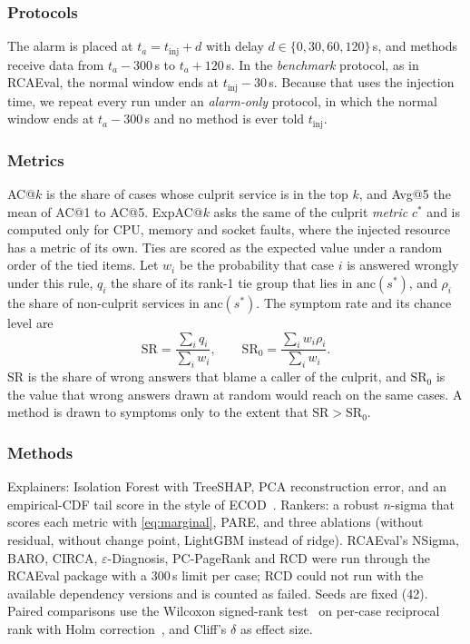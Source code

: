 \documentclass[conference]{IEEEtran}
\begin{document}
\subsubsection{Protocols}
The alarm is placed at $t_a=t_{\mathrm{inj}}+d$ with delay
$d\in\{0,30,60,120\}$\,s, and methods receive data from $t_a-300$\,s to
$t_a+120$\,s. In the \emph{benchmark} protocol, as in RCAEval, the normal window
ends at $t_{\mathrm{inj}}-30$\,s. Because that uses the injection time, we repeat
every run under an \emph{alarm-only} protocol, in which the normal window ends at
$t_a-300$\,s and no method is ever told $t_{\mathrm{inj}}$.

\subsubsection{Metrics}
AC@$k$ is the share of cases whose culprit service is in the top $k$, and Avg@5 the
mean of AC@1 to AC@5. ExpAC@$k$ asks the same of the culprit \emph{metric} $c^\ast$
and is computed only for CPU, memory and socket faults, where the injected resource
has a metric of its own. Ties are scored as the expected value under a random order
of the tied items. Let $w_i$ be the probability that case $i$ is answered wrongly
under this rule, $q_i$ the share of its rank-1 tie group that lies in
$\mathrm{anc}(s^\ast)$, and $\rho_i$ the share of non-culprit services in
$\mathrm{anc}(s^\ast)$. The symptom rate and its chance level are
\begin{equation}
\mathrm{SR}=\frac{\sum_i q_i}{\sum_i w_i},\qquad
\mathrm{SR}_0=\frac{\sum_i w_i\rho_i}{\sum_i w_i}.
\label{eq:sr}
\end{equation}
$\mathrm{SR}$ is the share of wrong answers that blame a caller of the culprit, and
$\mathrm{SR}_0$ is the value that wrong answers drawn at random would reach on the
same cases. A method is drawn to symptoms only to the extent that
$\mathrm{SR}>\mathrm{SR}_0$.

\subsubsection{Methods}
Explainers: Isolation Forest with TreeSHAP, PCA reconstruction error, and an
empirical-CDF tail score in the style of ECOD~\cite{li2022ecod}. Rankers: a robust
$n$-sigma that scores each metric with \eqref{eq:marginal}, PARE, and three
ablations (without residual, without change point, LightGBM instead of ridge).
RCAEval's NSigma, BARO, CIRCA, $\varepsilon$-Diagnosis, PC-PageRank and RCD were run
through the RCAEval package with a 300\,s limit per case; RCD could not run with
the available dependency versions and is counted as failed. Seeds are fixed (42).
Paired comparisons use the Wilcoxon signed-rank test~\cite{wilcoxon1945} on
per-case reciprocal rank with Holm correction~\cite{holm1979}, and Cliff's $\delta$
as effect size.
\end{document}
